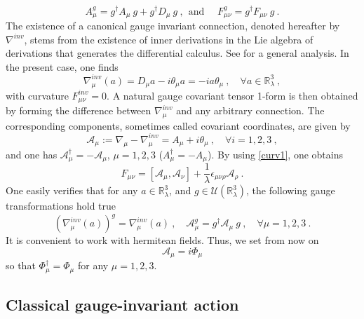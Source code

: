 \documentclass[11pt]{book}
\theoremstyle{break}
\begin{document}
%
\begin{equation*}
A_\mu^g = g^\dag A_\mu \ g + g^\dag D_\mu \ g \ , \ \ \mbox{and } \quad F^g_{\mu\nu} = g^\dag F_{\mu\nu} \ g \ \label{jauge-transfo}.
\end{equation*}
%
The existence of a canonical gauge invariant connection, denoted hereafter by $\nabla^{inv}$, stems from the existence of inner derivations in the Lie algebra of derivations that generates the differential calculus. See \cite{dubois_violette_lectures_1999} for a general analysis. In the present case, one finds
%
\begin{equation*} 
\nabla^{inv}_\mu(a) = D_\mu a - i \theta_\mu a = - i a \theta_\mu \ , \quad \forall a \in \mathbb{R}^3_\lambda \ , 
\end{equation*}
%
with curvature $F^{inv}_{\mu\nu}=0$. A natural gauge covariant tensor 1-form is then obtained by forming the difference between $\nabla^{inv}_\mu$ and any arbitrary connection. The corresponding components, sometimes called covariant coordinates, are given by%
%
\begin{equation*}
\mathcal{A}_\mu := \nabla_\mu - \nabla^{inv}_\mu = A_\mu + i \theta_\mu \ , \quad \forall i=1,2,3 \ , 
\end{equation*}
%
and one has $\mathcal{A}_\mu^\dag = - \mathcal{A}_\mu$, $\mu=1,2,3$ ($A_\mu^\dag=-A_\mu$). By using \eqref{curv1}, one obtains%
%
\begin{equation*} 
F_{\mu\nu} = \left[\mathcal{A}_\mu,\mathcal{A}_\nu\right] + \frac{1}{\lambda} \epsilon_{\mu\nu\rho} \mathcal{A}_\rho \ . \label{curv2}
\end{equation*}
%
One easily verifies that for any $a\in\mathbb{R}^3_\lambda$, and $g\in\mathcal{U}(\mathbb{R}^3_\lambda)$, the following gauge transformations hold true%
%
\begin{equation*}
(\nabla^{inv}_\mu(a))^g = \nabla^{inv}_\mu(a) \ , \quad \mathcal{A}^g_\mu = g^\dag \mathcal{A}_\mu \ g \ , \quad \forall \mu=1,2,3 \ . \label{conection-invariace}
\end{equation*}
%
It is convenient to work with hermitean fields. Thus, we set from now on
%
\begin{equation*}
\mathcal{A}_\mu = i \Phi_\mu
\end{equation*}
%
so that $\Phi^\dag_\mu = \Phi_\mu$ for any $\mu=1,2,3$. 


\subsection*{Classical gauge-invariant action}
\end{document}
